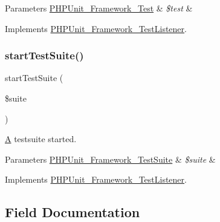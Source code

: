 \begin{DoxyParams}[1]{Parameters}
\mbox{\hyperlink{interface_p_h_p_unit___framework___test}{P\+H\+P\+Unit\+\_\+\+Framework\+\_\+\+Test}} & {\em \$test} & \\
\hline
\end{DoxyParams}


Implements \mbox{\hyperlink{interface_p_h_p_unit___framework___test_listener_a1a9bddc54f26bb3fb5c2ec9778ea5198}{P\+H\+P\+Unit\+\_\+\+Framework\+\_\+\+Test\+Listener}}.

\mbox{\label{class_p_h_p_unit___util___test_dox___result_printer_a901a86a623d83184267b21f2daee0ff5}} 
\subsubsection{\texorpdfstring{start\+Test\+Suite()}{startTestSuite()}}
{\footnotesize\ttfamily start\+Test\+Suite (\begin{DoxyParamCaption}\item[{\mbox{\hyperlink{class_p_h_p_unit___framework___test_suite}{P\+H\+P\+Unit\+\_\+\+Framework\+\_\+\+Test\+Suite}}}]{\$suite }\end{DoxyParamCaption})}

\mbox{\hyperlink{class_a}{A}} testsuite started.


\begin{DoxyParams}[1]{Parameters}
\mbox{\hyperlink{class_p_h_p_unit___framework___test_suite}{P\+H\+P\+Unit\+\_\+\+Framework\+\_\+\+Test\+Suite}} & {\em \$suite} & \\
\hline
\end{DoxyParams}


Implements \mbox{\hyperlink{interface_p_h_p_unit___framework___test_listener_a901a86a623d83184267b21f2daee0ff5}{P\+H\+P\+Unit\+\_\+\+Framework\+\_\+\+Test\+Listener}}.



\subsection{Field Documentation}
\mbox{\label{class_p_h_p_unit___util___test_dox___result_printer_aa821bfe1fe69e2ffb0e3969e844b6359}} 
